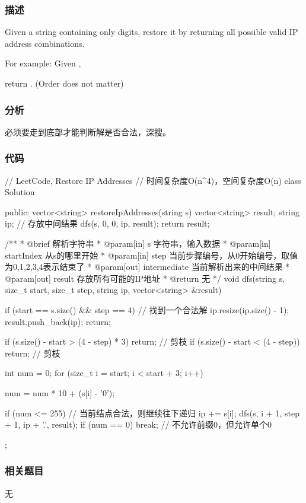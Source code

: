 \subsubsection{描述}
Given a string containing only digits, restore it by returning all possible valid IP address combinations.

For example:
Given ,

return \code{["255.255.11.135", "255.255.111.35"]}. (Order does not matter)


\subsubsection{分析}
必须要走到底部才能判断解是否合法，深搜。


\subsubsection{代码}
\begin{Code}
	// LeetCode, Restore IP Addresses
	// 时间复杂度O(n^4)，空间复杂度O(n)
	class Solution {
		public:
		vector<string> restoreIpAddresses(string s) {
			vector<string> result;
			string ip; // 存放中间结果
			dfs(s, 0, 0, ip, result);
			return result;
		}
		
		/**
		* @brief 解析字符串
		* @param[in] s 字符串，输入数据
		* @param[in] startIndex 从s的哪里开始
		* @param[in] step 当前步骤编号，从0开始编号，取值为0,1,2,3,4表示结束了
		* @param[out] intermediate 当前解析出来的中间结果
		* @param[out] result 存放所有可能的IP地址
		* @return 无
		*/
		void dfs(string s, size_t start, size_t step, string ip,
		vector<string> &result) {
			if (start == s.size() && step == 4) {  // 找到一个合法解
				ip.resize(ip.size() - 1);
				result.push_back(ip);
				return;
			}
			
			if (s.size() - start > (4 - step) * 3)
			return;  // 剪枝
			if (s.size() - start < (4 - step))
			return;  // 剪枝
			
			int num = 0;
			for (size_t i = start; i < start + 3; i++) {
				num = num * 10 + (s[i] - '0');
				
				if (num <= 255) {  // 当前结点合法，则继续往下递归
					ip += s[i];
					dfs(s, i + 1, step + 1, ip + '.', result);
				}
				if (num == 0) break;  // 不允许前缀0，但允许单个0
			}
		}
	};
\end{Code}


\subsubsection{相关题目}
\begindot
\item 无
\myenddot


